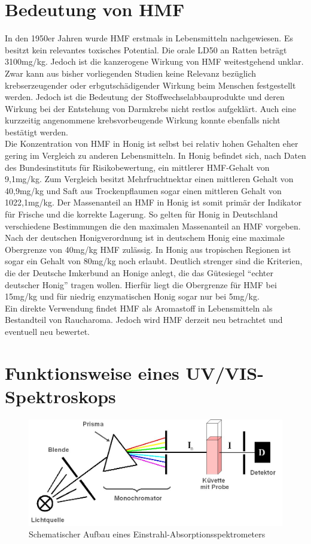 \section{Bedeutung von HMF}
In den 1950er Jahren wurde HMF erstmals in Lebensmitteln nachgewiesen. Es besitzt kein relevantes toxisches Potential. Die orale LD50 an Ratten beträgt 3100mg/kg. Jedoch ist die kanzerogene Wirkung von HMF weitestgehend unklar. Zwar kann aus bisher vorliegenden Studien keine Relevanz bezüglich krebserzeugender oder erbgutschädigender Wirkung beim Menschen festgestellt werden. Jedoch ist die Bedeutung der Stoffwechselabbauprodukte und deren Wirkung bei der Entstehung von Darmkrebs nicht restlos aufgeklärt. Auch eine kurzzeitig angenommene krebsvorbeugende Wirkung konnte ebenfalls nicht bestätigt werden.
\\
Die Konzentration von HMF in Honig ist selbst bei relativ hohen Gehalten eher gering im Vergleich zu anderen Lebensmitteln. In Honig befindet sich, nach Daten des Bundesinstituts für Risikobewertung, ein mittlerer HMF-Gehalt von 9,1mg/kg. Zum Vergleich besitzt Mehrfruchtnektar einen mittleren Gehalt von 40,9mg/kg und Saft aus Trockenpflaumen sogar einen mittleren Gehalt von 1022,1mg/kg. Der Massenanteil an HMF in Honig ist somit primär der Indikator für Frische und die korrekte Lagerung. So gelten für Honig in Deutschland verschiedene Bestimmungen die den maximalen Massenanteil an HMF vorgeben. Nach der deutschen Honigverordnung ist in deutschem Honig eine maximale Obergrenze von 40mg/kg HMF zulässig. In Honig aus tropischen Regionen ist sogar ein Gehalt von 80mg/kg noch erlaubt. Deutlich strenger sind die Kriterien, die der Deutsche Imkerbund an Honige anlegt, die das Gütesiegel ``echter deutscher Honig'' tragen wollen. Hierfür liegt die Obergrenze für HMF bei 15mg/kg und für niedrig enzymatischen Honig sogar nur bei 5mg/kg.
\\
Ein direkte Verwendung findet HMF als Aromastoff in Lebensmitteln als Bestandteil von Raucharoma. Jedoch wird HMF derzeit neu betrachtet und eventuell neu bewertet.~\cite{BfR}

\section{Funktionsweise eines UV/VIS-Spektroskops}

\begin{figure}[htbp]
	\centering
		\includegraphics[width=1.00\textwidth]{../Bilder/Einstrahlspektrometer.jpg}
	\caption{Schematischer Aufbau eines Einstrahl-Absorptionsspektrometers}
	\label{fig:Einstrahlspektrometer}
\end{figure}

